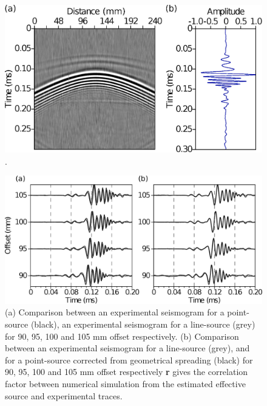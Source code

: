 \documentclass[manuscript,revised]{geophysics}
\begin{document}
\begin{figure}[!h]
	\centering
	\includegraphics[scale=0.4]{fig/amplitude_stack_principle.eps}
	\caption{.}
	\label{amplitude_stack_principle}
\end{figure}

\begin{figure}[!h]
	\centering
	\includegraphics[scale=0.5]{fig/bialt_2d3d_merge.eps}
	\caption{(a) Comparison between an experimental seismogram for a point-source (black), an experimental seismogram for a line-source (grey) for 90, 95, 100 and 105 mm offset respectively. (b) Comparison between an experimental seismogram for a line-source (grey), and for a point-source corrected from geometrical spreading (black) for 90, 95, 100 and 105 mm offset respectively \textbf{r} gives the correlation factor between numerical simulation from the estimated effective source and experimental traces.}
	\label{panel_amplitude}
\end{figure}
\end{document}
